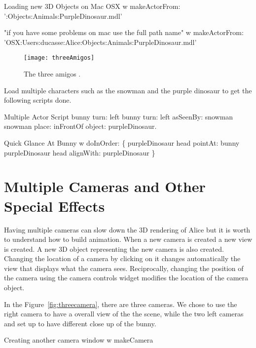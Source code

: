 \begin{scriptwithtitle}{Loading new 3D Objects on Mac OSX}
w makeActorFrom: ':Objects:Animals:PurpleDinosaur.mdl'

"if you have some problems on mac use the full path name"
w makeActorFrom: 'OSX:Users:ducasse:Alice:Objects:Animals:PurpleDinosaur.mdl'
\end{scriptwithtitle}

\begin{figure}
\begin{center}\texttt{[image: threeAmigos]}\end{center}
\caption{The three amigos .\label{fig:threeAmigos}}
\end{figure}

Load multiple characters such as the snowman and the purple dinosaur to get the 
following scripts done. 

\begin{scriptwithtitle}{Multiple Actor Script}
bunny turn: left
bunny turn: left asSeenBy: snowman
snowman place: inFrontOf object: purpleDinosaur.
\end{scriptwithtitle}

\begin{scriptwithtitle}{Quick Glance At Bunny}
w doInOrder: \{
   purpleDinosaur head pointAt: bunny
   purpleDinosaur head alignWith:  purpleDinosaur \}
\end{scriptwithtitle}


\section{Multiple Cameras and Other Special Effects}

Having multiple cameras can slow down the 3D rendering of Alice but it 
is worth to understand how to build animation. When a new camera is created
a new view is created. A new 3D object representing the new camera is also created. Changing the location of a camera by clicking on it changes automatically the view that displays what the camera sees. Reciprocally, changing the position of the camera using the camera controls widget modifies the location of the camera object.

 In the Figure~\ref{fig:threecamera}, there are three cameras. We chose to use the 
right camera to have a overall view of the the scene, while the two left cameras and set up to have different close up of the bunny. 

\begin{scriptwithtitle}{Creating another camera window}
w makeCamera
\end{scriptwithtitle}

